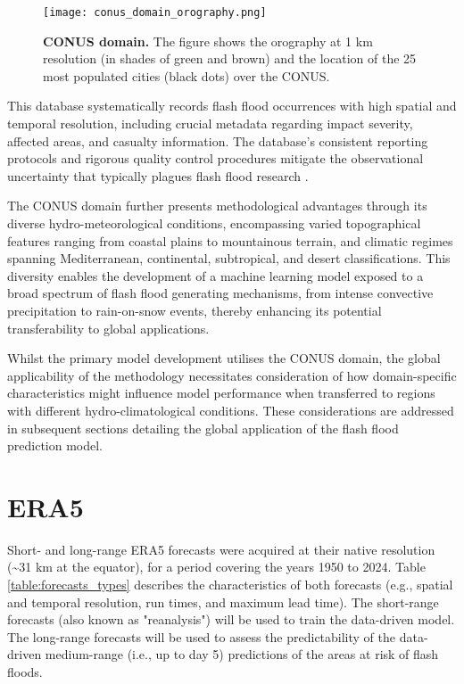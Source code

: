 \begin{figure}[htbp]
\centering
\texttt{[image: conus\_domain\_orography.png]}
\caption{\textbf{CONUS domain.} The figure shows the orography at 1 km resolution (in shades of green and brown) and the location of the 25 most populated cities (black dots) over the CONUS.}
\label{fig:conus_domain}
\end{figure}

This database systematically records flash flood occurrences with high spatial and temporal resolution, including crucial metadata regarding impact severity, affected areas, and casualty information. The database's consistent reporting protocols and rigorous quality control procedures mitigate the observational uncertainty that typically plagues flash flood research \citep{Panwar_2020}.

The CONUS domain further presents methodological advantages through its diverse hydro-meteorological conditions, encompassing varied topographical features ranging from coastal plains to mountainous terrain, and climatic regimes spanning Mediterranean, continental, subtropical, and desert classifications. This diversity enables the development of a machine learning model exposed to a broad spectrum of flash flood generating mechanisms, from intense convective precipitation to rain-on-snow events, thereby enhancing its potential transferability to global applications.

Whilst the primary model development utilises the CONUS domain, the global applicability of the methodology necessitates consideration of how domain-specific characteristics might influence model performance when transferred to regions with different hydro-climatological conditions. These considerations are addressed in subsequent sections detailing the global application of the flash flood prediction model.


\section{ERA5}

Short- and long-range ERA5 forecasts were acquired at their native resolution (\textasciitilde31 km at the equator), for a period covering the years 1950 to 2024. Table \ref{table:forecasts_types} describes the characteristics of both forecasts (e.g., spatial and temporal resolution, run times, and maximum lead time). The short-range forecasts (also known as "reanalysis") will be used to train the data-driven model. The long-range forecasts will be used to assess the predictability of the data-driven medium-range (i.e., up to day 5) predictions of the areas at risk of flash floods.

